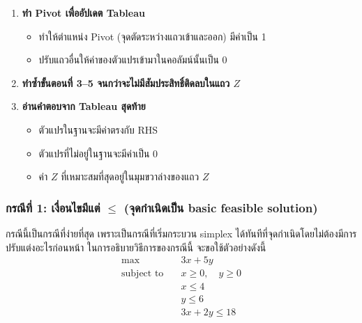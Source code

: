 \begin{algorithm}
\begin{enumerate}[label=\textbf{ขั้นที่ \arabic*.}, align=left, labelwidth=5em, labelsep=1em, leftmargin=*, itemsep=0pt, topsep=0pt, parsep=0pt, partopsep=0pt]
  \item \textbf{ทำ Pivot เพื่ออัปเดต Tableau}  
  \begin{itemize}[itemsep=0pt, topsep=0pt, parsep=0pt, partopsep=0pt]
    \item ทำให้ตำแหน่ง Pivot (จุดตัดระหว่างแถวเข้าและออก) มีค่าเป็น 1
    \item ปรับแถวอื่นให้ค่าของตัวแปรเข้ามาในคอลัมน์นั้นเป็น 0
  \end{itemize}

  \item \textbf{ทำซ้ำขั้นตอนที่ 3–5 จนกว่าจะไม่มีสัมประสิทธิ์ติดลบในแถว $Z$}

  \item \textbf{อ่านคำตอบจาก Tableau สุดท้าย}  
  \begin{itemize}[itemsep=0pt, topsep=0pt, parsep=0pt, partopsep=0pt]
    \item ตัวแปรในฐานจะมีค่าตรงกับ RHS
    \item ตัวแปรที่ไม่อยู่ในฐานจะมีค่าเป็น 0
    \item ค่า $Z$ ที่เหมาะสมที่สุดอยู่ในมุมขวาล่างของแถว $Z$
  \end{itemize}

\end{enumerate}
\end{algorithm}

\subsubsection{กรณีที่ 1: เงื่อนไขมีแต่ $\leq$ (จุดกำเนิดเป็น basic feasible solution)}
กรณีนี้เป็นกรณีที่ง่ายที่สุด เพราะเป็นกรณีที่เริ่มกระบวน simplex ได้ทันทีที่จุดกำเนิดโดยไม่ต้องมีการปรับแต่งอะไรก่อนหน้า
ในการอธิบายวิธีการของกรณีนี้ จะขอใช้ตัวอย่างดังนี้
\begin{align*}
    \max \quad & 3x + 5y \\
    \text{subject to} \quad
    & x \geq 0, \quad y \geq 0 \\
    & x \leq 4 \\
    & y \leq 6 \\
    & 3x + 2y \leq 18
\end{align*}

